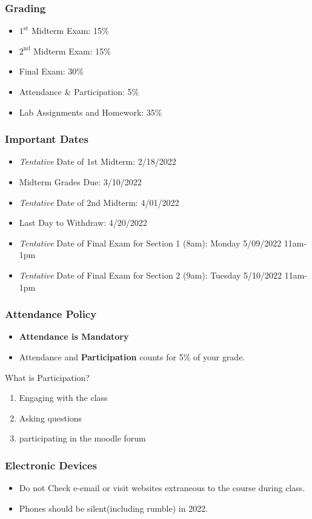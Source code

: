 \documentclass[17pt]{beamer}
\begin{document}
\begin{frame}
	\frametitle{Grading}
		\begin{itemize}
			\item $1^\text{st}$ Midterm Exam: 15\%
			\item $2^\text{nd}$ Midterm Exam: 15\%
			\item Final Exam: 30\%
			\item Attendance \& Participation: 5\% 
			\item Lab Assignments and Homework: 35\%
		\end{itemize}
\end{frame}
\begin{frame}
	\frametitle{Important Dates}
	\begin{itemize}
		\item \textit{Tentative} Date of 1st Midterm: 2/18/2022
		\item Midterm Grades Due: 3/10/2022
		\item \textit{Tentative} Date of 2nd Midterm: 4/01/2022 
		\item Last Day to Withdraw: 4/20/2022
		\item \textit{Tentative} Date of Final Exam for Section 1 (8am): Monday 5/09/2022 11am-1pm
		\item \textit{Tentative} Date of Final Exam for Section 2 (9am): Tuesday 5/10/2022 11am-1pm
	\end{itemize}
\end{frame}
\begin{frame}
	\frametitle{Attendance Policy}
	\begin{itemize}
		\item \textbf{Attendance is Mandatory}
		\item Attendance and \textbf{Participation} counts for 5\% of your grade.
	\end{itemize}
What is Participation?
\begin{enumerate}
	\item Engaging with the class
	\item Asking questions
	\item participating in the moodle forum
\end{enumerate}
\end{frame}
\begin{frame}
	\frametitle{Electronic Devices}
	\begin{itemize}
		\item Do not Check e-email or visit websites extraneous to the course during class.
		\item Phones should be silent(including rumble) in 2022. 
	\end{itemize}
\end{frame}
\end{document}
